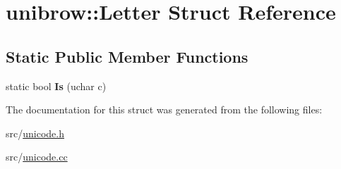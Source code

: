 \hypertarget{structunibrow_1_1_letter}{}\section{unibrow\+:\+:Letter Struct Reference}
\label{structunibrow_1_1_letter}
\subsection*{Static Public Member Functions}
\begin{DoxyCompactItemize}
\item 
\hypertarget{structunibrow_1_1_letter_a102f3b1d0b14704846a16f95485c5208}{}static bool {\bfseries Is} (uchar c)\label{structunibrow_1_1_letter_a102f3b1d0b14704846a16f95485c5208}

\end{DoxyCompactItemize}


The documentation for this struct was generated from the following files\+:\begin{DoxyCompactItemize}
\item 
src/\hyperlink{unicode_8h}{unicode.\+h}\item 
src/\hyperlink{unicode_8cc}{unicode.\+cc}\end{DoxyCompactItemize}
